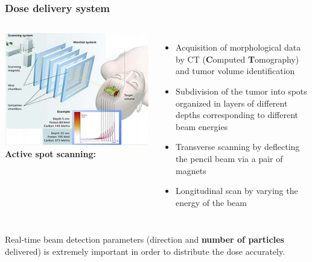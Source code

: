 \documentclass[aspectratio=169]{beamer}
\begin{document}
	\begin{frame}
		\frametitle{Dose delivery system}
		\begin{columns}
			\includegraphics[width=0.95 \textwidth]{IMG/Beam_Monitoring.PNG}
			{\color{blue} \textbf{Active spot scanning:}}
			\begin{itemize}
				\item Acquisition of morphological data by CT (\textbf{C}omputed \textbf{T}omography) and tumor volume identification
				\item Subdivision of the tumor into spots organized in layers of different depths corresponding to different beam energies
				\item Transverse scanning by deflecting the pencil beam via a pair of magnets
				\item Longitudinal scan by varying the energy of the beam
			\end{itemize}
		\end{columns}
	\vspace{0.2 cm}
	{\color{blue} Real-time beam detection parameters (direction and \textbf{number of particles} delivered) \newline is extremely important in order to distribute the dose accurately.}
	\end{frame}
\end{document}
